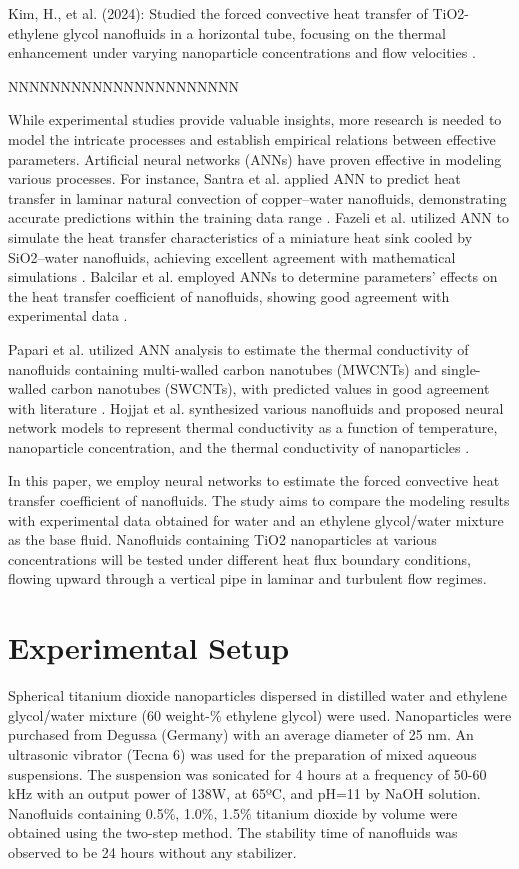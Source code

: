 \documentclass{article}
\begin{document}
Kim, H., et al. (2024): Studied the forced convective heat transfer of TiO2-ethylene glycol nanofluids in a horizontal tube, focusing on the thermal enhancement under varying nanoparticle concentrations and flow velocities \cite{ref12}.


NNNNNNNNNNNNNNNNNNNNNN

While experimental studies provide valuable insights, more research is needed to model the intricate processes and establish empirical relations between effective parameters. Artificial neural networks (ANNs) have proven effective in modeling various processes. For instance, Santra et al. applied ANN to predict heat transfer in laminar natural convection of copper–water nanofluids, demonstrating accurate predictions within the training data range \cite{ref3}. Fazeli et al. utilized ANN to simulate the heat transfer characteristics of a miniature heat sink cooled by SiO2–water nanofluids, achieving excellent agreement with mathematical simulations \cite{ref4}. Balcilar et al. employed ANNs to determine parameters' effects on the heat transfer coefficient of nanofluids, showing good agreement with experimental data \cite{ref5}.

Papari et al. utilized ANN analysis to estimate the thermal conductivity of nanofluids containing multi-walled carbon nanotubes (MWCNTs) and single-walled carbon nanotubes (SWCNTs), with predicted values in good agreement with literature \cite{ref6}. Hojjat et al. synthesized various nanofluids and proposed neural network models to represent thermal conductivity as a function of temperature, nanoparticle concentration, and the thermal conductivity of nanoparticles \cite{ref7}.

In this paper, we employ neural networks to estimate the forced convective heat transfer coefficient of nanofluids. The study aims to compare the modeling results with experimental data obtained for water and an ethylene glycol/water mixture as the base fluid. Nanofluids containing TiO2 nanoparticles at various concentrations will be tested under different heat flux boundary conditions, flowing upward through a vertical pipe in laminar and turbulent flow regimes.


\section{Experimental Setup}
Spherical titanium dioxide nanoparticles dispersed in distilled water and ethylene glycol/water mixture (60 weight-\% ethylene glycol) were used. Nanoparticles were purchased from Degussa (Germany) with an average diameter of 25 nm. An ultrasonic vibrator (Tecna 6) was used for the preparation of mixed aqueous suspensions. The suspension was sonicated for 4 hours at a frequency of 50-60 kHz with an output power of 138W, at 65ºC, and pH=11 by NaOH solution. Nanofluids containing 0.5\%, 1.0\%, 1.5\% titanium dioxide by volume were obtained using the two-step method. The stability time of nanofluids was observed to be 24 hours without any stabilizer.
\end{document}
